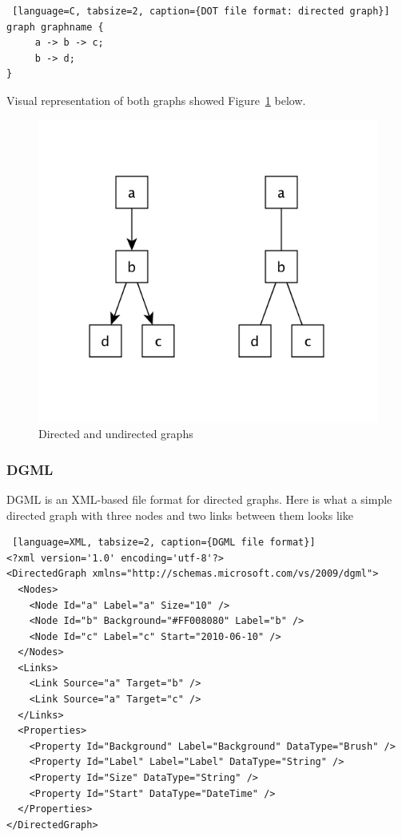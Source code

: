 \begin{center}
\begin{lstlisting} [language=C, tabsize=2, caption={DOT file format: directed graph}]
graph graphname {
     a -> b -> c;
     b -> d;
}
\end{lstlisting}
\end{center}

Visual representation of both graphs showed Figure~\ref{fig:dot_graphs} below.

\begin{figure}[h!]
\centering
\includegraphics[scale=0.3]{pictures/dot_graph.png}
\caption{Directed and undirected graphs}
\label{fig:dot_graphs}
\end{figure}

\subsubsection{DGML}
DGML is an XML-based file format for directed graphs. Here is what a simple directed graph with three nodes and two links between them looks like

\begin{center}
\begin{lstlisting} [language=XML, tabsize=2, caption={DGML file format}]
<?xml version='1.0' encoding='utf-8'?>
<DirectedGraph xmlns="http://schemas.microsoft.com/vs/2009/dgml">
  <Nodes>
    <Node Id="a" Label="a" Size="10" />
    <Node Id="b" Background="#FF008080" Label="b" />
    <Node Id="c" Label="c" Start="2010-06-10" />
  </Nodes>
  <Links>
    <Link Source="a" Target="b" />
    <Link Source="a" Target="c" />
  </Links>
  <Properties>
    <Property Id="Background" Label="Background" DataType="Brush" />
    <Property Id="Label" Label="Label" DataType="String" />
    <Property Id="Size" DataType="String" />
    <Property Id="Start" DataType="DateTime" />
  </Properties>
</DirectedGraph>
\end{lstlisting}
\end{center}

